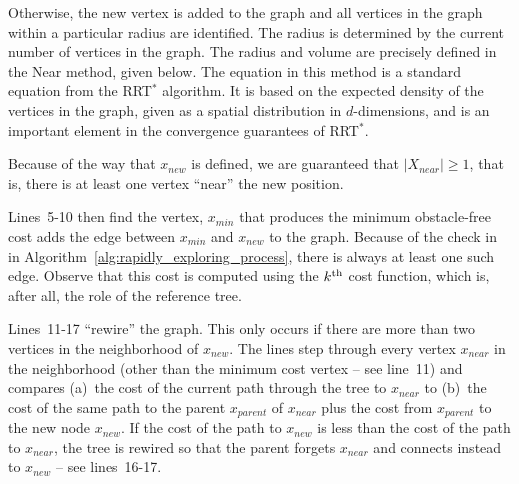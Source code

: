 \documentclass{article}
\begin{document}
Otherwise, the new vertex is added to the graph and all vertices in the graph within a particular radius are identified.  
The radius is determined by the current number of vertices in the graph. 
The radius and volume are precisely defined in the {\sc Near} method, given below. The equation in this method is a standard equation from the RRT$^{*}$ algorithm.  It is based on the expected density of the vertices in the graph, given as a spatial distribution in $d$-dimensions, and is an important element in the convergence guarantees of RRT$^{*}$.


Because of the way that $x_{new}$ is defined, we are guaranteed that $|X_{near}| \geq 1$, that is, there is at least one vertex ``near'' the new position.

Lines~5-10 then find the vertex, $x_{min}$ that produces the minimum obstacle-free cost adds the edge between $x_{min}$ and $x_{new}$ to the graph.  
Because of the check in in Algorithm~\ref{alg:rapidly_exploring_process}, there is always at least one such edge.  
Observe that this cost is computed using the $k^{\rm th}$ cost function, which is, after all, the role of the reference tree.

Lines~11-17 ``rewire'' the graph.  
This only occurs if there are more than two vertices in the neighborhood of $x_{new}$.  
The lines step through every vertex $x_{near}$ in the neighborhood (other than the minimum cost vertex -- see line~11) and compares (a)~the cost of the current path through the tree to $x_{near}$ to (b)~the cost of the same path to the parent $x_{parent}$ of $x_{near}$ plus the cost from $x_{parent}$ to the new node $x_{new}$. 
If the cost of the path to $x_{new}$ is less than the cost of the path to $x_{near}$, the tree is rewired so that the parent forgets $x_{near}$ and connects instead to $x_{new}$ -- see lines~16-17.
\end{document}
